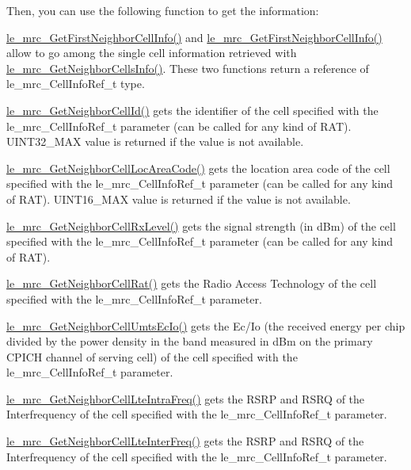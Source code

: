 Then, you can use the following function to get the information\+:
\begin{DoxyItemize}
\item \hyperlink{le__mrc__interface_8h_ab50724fd74818d71da1dfcd2217dd795}{le\+\_\+mrc\+\_\+\+Get\+First\+Neighbor\+Cell\+Info()} and \hyperlink{le__mrc__interface_8h_ab50724fd74818d71da1dfcd2217dd795}{le\+\_\+mrc\+\_\+\+Get\+First\+Neighbor\+Cell\+Info()} allow to go among the single cell information retrieved with \hyperlink{le__mrc__interface_8h_a8d44fe46e61f3399c5e0dd6002b042ae}{le\+\_\+mrc\+\_\+\+Get\+Neighbor\+Cells\+Info()}. These two functions return a reference of le\+\_\+mrc\+\_\+\+Cell\+Info\+Ref\+\_\+t type.
\item \hyperlink{le__mrc__interface_8h_abdbc94e474235417d8610e2eb95558eb}{le\+\_\+mrc\+\_\+\+Get\+Neighbor\+Cell\+Id()} gets the identifier of the cell specified with the le\+\_\+mrc\+\_\+\+Cell\+Info\+Ref\+\_\+t parameter (can be called for any kind of R\+AT). U\+I\+N\+T32\+\_\+\+M\+AX value is returned if the value is not available.
\item \hyperlink{le__mrc__interface_8h_a70ba0ca70367bc673a6bca1e246bb88f}{le\+\_\+mrc\+\_\+\+Get\+Neighbor\+Cell\+Loc\+Area\+Code()} gets the location area code of the cell specified with the le\+\_\+mrc\+\_\+\+Cell\+Info\+Ref\+\_\+t parameter (can be called for any kind of R\+AT). U\+I\+N\+T16\+\_\+\+M\+AX value is returned if the value is not available.
\item \hyperlink{le__mrc__interface_8h_aeae116235802afd041afd9df009642aa}{le\+\_\+mrc\+\_\+\+Get\+Neighbor\+Cell\+Rx\+Level()} gets the signal strength (in d\+Bm) of the cell specified with the le\+\_\+mrc\+\_\+\+Cell\+Info\+Ref\+\_\+t parameter (can be called for any kind of R\+AT).
\item \hyperlink{le__mrc__interface_8h_a5bb3e75b74260a9cee57247e1968a31f}{le\+\_\+mrc\+\_\+\+Get\+Neighbor\+Cell\+Rat()} gets the Radio Access Technology of the cell specified with the le\+\_\+mrc\+\_\+\+Cell\+Info\+Ref\+\_\+t parameter.
\item \hyperlink{le__mrc__interface_8h_a94e452e3d7063d3359dcbb97a31b984b}{le\+\_\+mrc\+\_\+\+Get\+Neighbor\+Cell\+Umts\+Ec\+Io()} gets the Ec/\+Io (the received energy per chip divided by the power density in the band measured in d\+Bm on the primary C\+P\+I\+CH channel of serving cell) of the cell specified with the le\+\_\+mrc\+\_\+\+Cell\+Info\+Ref\+\_\+t parameter.
\item \hyperlink{le__mrc__interface_8h_a7754836120c34cd2610b9777bd56409f}{le\+\_\+mrc\+\_\+\+Get\+Neighbor\+Cell\+Lte\+Intra\+Freq()} gets the R\+S\+RP and R\+S\+RQ of the Interfrequency of the cell specified with the le\+\_\+mrc\+\_\+\+Cell\+Info\+Ref\+\_\+t parameter.
\item \hyperlink{le__mrc__interface_8h_a331545d4e396c513bba028db981c016b}{le\+\_\+mrc\+\_\+\+Get\+Neighbor\+Cell\+Lte\+Inter\+Freq()} gets the R\+S\+RP and R\+S\+RQ of the Interfrequency of the cell specified with the le\+\_\+mrc\+\_\+\+Cell\+Info\+Ref\+\_\+t parameter.
\end{DoxyItemize}

